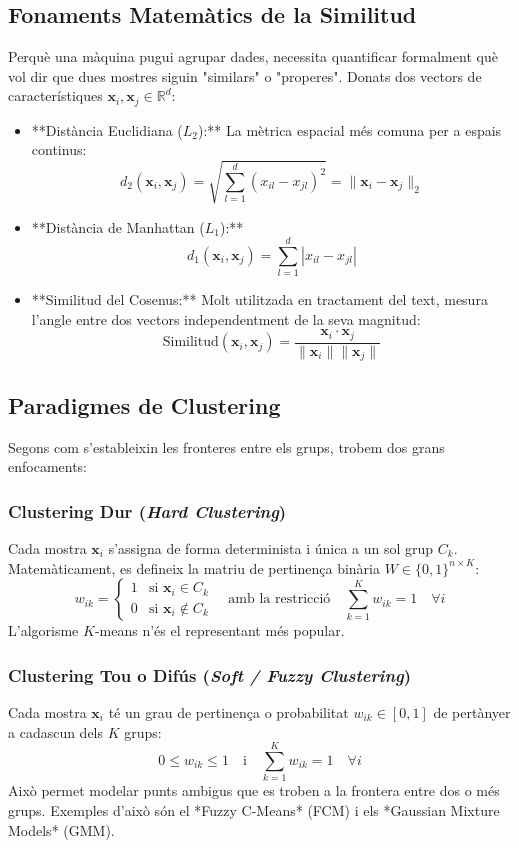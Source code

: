 \documentclass[11pt, a4paper]{article}
\begin{document}
\subsection{Fonaments Matemàtics de la Similitud}
Perquè una màquina pugui agrupar dades, necessita quantificar formalment què vol dir que dues mostres siguin "similars" o "properes". Donats dos vectors de característiques $\mathbf{x}_i, \mathbf{x}_j \in \mathbb{R}^d$:

\begin{itemize}
    \item **Distància Euclidiana ($L_2$):** La mètrica espacial més comuna per a espais continus:
    \[
    d_2(\mathbf{x}_i, \mathbf{x}_j) = \sqrt{\sum_{l=1}^{d} (x_{il} - x_{jl})^2} = \lVert \mathbf{x}_i - \mathbf{x}_j \rVert_2
    \]
    \item **Distància de Manhattan ($L_1$):**
    \[
    d_1(\mathbf{x}_i, \mathbf{x}_j) = \sum_{l=1}^{d} |x_{il} - x_{jl}|
    \]
    \item **Similitud del Cosenus:** Molt utilitzada en tractament del text, mesura l'angle entre dos vectors independentment de la seva magnitud:
    \[
    \text{Similitud}(\mathbf{x}_i, \mathbf{x}_j) = \frac{\mathbf{x}_i \cdot \mathbf{x}_j}{\lVert \mathbf{x}_i \rVert \lVert \mathbf{x}_j \rVert}
    \]
\end{itemize}

\subsection{Paradigmes de Clustering}
Segons com s'estableixin les fronteres entre els grups, trobem dos grans enfocaments:

\subsubsection{Clustering Dur (\textit{Hard Clustering})}
Cada mostra $\mathbf{x}_i$ s'assigna de forma determinista i única a un sol grup $C_k$. Matemàticament, es defineix la matriu de pertinença binària $W \in \{0, 1\}^{n \times K}$:
\[
w_{ik} = \begin{cases} 1 & \text{si } \mathbf{x}_i \in C_k \\ 0 & \text{si } \mathbf{x}_i \notin C_k \end{cases} \quad \text{amb la restricció} \quad \sum_{k=1}^{K} w_{ik} = 1 \quad \forall i
\]
L'algorisme $K$-means n'és el representant més popular.

\subsubsection{Clustering Tou o Difús (\textit{Soft / Fuzzy Clustering})}
Cada mostra $\mathbf{x}_i$ té un grau de pertinença o probabilitat $w_{ik} \in [0, 1]$ de pertànyer a cadascun dels $K$ grups:
\[
0 \le w_{ik} \le 1 \quad \text{i} \quad \sum_{k=1}^{K} w_{ik} = 1 \quad \forall i
\]
Això permet modelar punts ambigus que es troben a la frontera entre dos o més grups. Exemples d'això són el *Fuzzy C-Means* (FCM) i els *Gaussian Mixture Models* (GMM).
\end{document}

